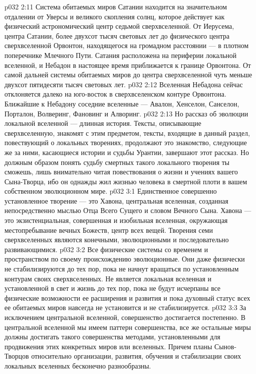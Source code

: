 \vs p032 2:11 Система обитаемых миров Сатании находится на значительном отдалении от Уверсы и великого скопления солнц, которое действует как физический астрономический центр седьмой сверхвселенной. От Иерусема, центра Сатании, более двухсот тысяч световых лет до физического центра сверхвселенной Орвонтон, находящегося на громадном расстоянии --- в плотном поперечнике Млечного Пути. Сатания расположена на периферии локальной вселенной, и Небадон в настоящее время приближается к границе Орвонтона. От самой дальней системы обитаемых миров до центра сверхвселенной чуть меньше двухсот пятидесяти тысяч световых лет.
\vs p032 2:12 Вселенная Небадона сейчас отклоняется далеко на юго\hyp{}восток в сверхвселенском контуре Орвонтона. Ближайшие к Небадону соседние вселенные --- Авалон, Хенселон, Санселон, Порталон, Волверинг, Фановинг и Алворинг.
\vs p032 2:13 \pc Но рассказ об эволюции локальной вселенной --- длинная история. Тексты, описывающие сверхвселенную, знакомят с этим предметом, тексты, входящие в данный раздел, повествующий о локальных творениях, продолжают это знакомство, следующие же за ними, касающиеся истории и судьбы Урантии, завершают этот рассказ. Но должным образом понять судьбу смертных такого локального творения ты сможешь, лишь внимательно читая повествования о жизни и учениях вашего Сына\hyp{}Творца, ибо он однажды жил жизнью человека в смертной плоти в вашем собственном эволюционном мире.
\vs p032 3:1 Единственное совершенно установленное творение --- это Хавона, центральная вселенная, созданная непосредственно мыслью Отца Всего Сущего и словом Вечного Сына. Хавона --- это экзистенциальная, совершенная и изобильная вселенная, окружающая местопребывание вечных Божеств, центр всех вещей. Творения семи сверхвселенных являются конечными, эволюционными и последовательно развивающимися.
\vs p032 3:2 Все физические системы со временем и пространством по своему происхождению эволюционные. Они даже физически не стабилизируются до тех пор, пока не начнут вращаться по установленным контурам своих сверхвселенных. Не является локальная вселенная и установленной в свет и жизнь до тех пор, пока не будут исчерпаны все физические возможности ее расширения и развития и пока духовный статус всех ее обитаемых миров навсегда не установится и не стабилизируется.
\vs p032 3:3 За исключением центральной вселенной, совершенство достигается постепенно. В центральной вселенной мы имеем паттерн совершенства, все же остальные миры должны достигать такого совершенства методами, установленными для продвижения этих конкретных миров или вселенных. Причем планы Сынов\hyp{}Творцов относительно организации, развития, обучения и стабилизации своих локальных вселенных бесконечно разнообразны.
